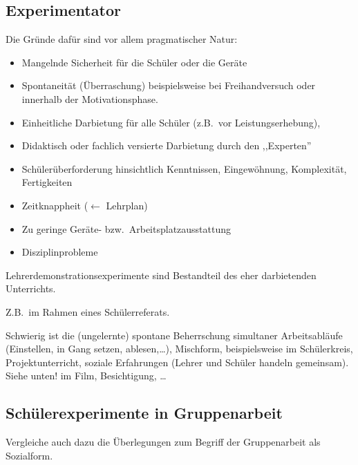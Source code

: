 \subsection{Experimentator}
\begin{itemize}
	Die Gr\"{u}nde daf\"{u}r sind vor allem pragmatischer Natur:
	
	\begin{itemize}
		\item Mangelnde Sicherheit f\"{u}r die Sch\"{u}ler oder die Ger\"{a}te
		\item Spontaneit\"{a}t (\"{U}berraschung) beispielsweise bei Freihandversuch oder innerhalb der
		Motivationsphase.
		\item Einheitliche Darbietung f\"{u}r alle Sch\"{u}ler
		(z.B.\ vor Leistungserhebung),
		\item Didaktisch oder fachlich versierte Darbietung durch den ,,Experten''
		\item Sch\"{u}ler\"{u}berforderung  hinsichtlich Kenntnissen, Eingew\"{o}hnung,
		Komplexit\"{a}t, Fertigkeiten
		\item Zeitknappheit ($\gets$ Lehrplan)
		\item Zu geringe Ger\"{a}te- bzw.\ Arbeitsplatzausstattung
		\item Disziplinprobleme
	\end{itemize}

	Lehrerdemonstrationsexperimente sind Bestandteil des eher
	darbietenden Unterrichts.
	
	Z.B.\ im Rahmen eines Sch\"{u}lerreferats.
	
	Schwierig ist die (ungelernte) spontane Beherrschung simultaner
	Arbeitsabl\"{a}ufe (Einstellen, in Gang setzen, ablesen,\dots),
	Mischform, beispielsweise im Sch\"{u}lerkreis, Projektunterricht,
	soziale Erfahrungen (Lehrer und Sch\"{u}ler handeln gemeinsam).
	 Siehe unten!
	 im Film, Besichtigung, \dots
\end{itemize}

\subsection{Sch\"{u}lerexperimente in Gruppenarbeit}

Vergleiche auch dazu die \"{U}berlegungen zum Begriff der
Gruppenarbeit als Sozialform.

